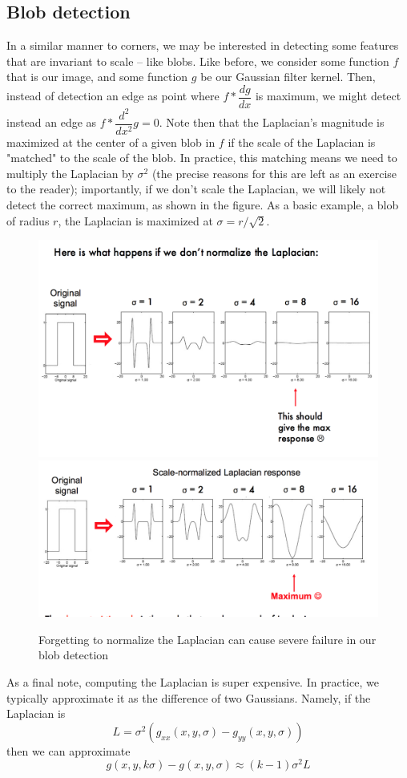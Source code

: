 \documentclass[a4paper, 12pt]{article}
\numberwithin{equation}{section}
\begin{document}
\subsection{Blob detection}
In a similar manner to corners, we may be interested in detecting some features that are invariant to scale -- like blobs. Like before, we consider some function $f$ that is our image, and some function $g$ be our Gaussian filter kernel. Then, instead of detection an edge as point where $f * \dfrac{dg}{dx}$ is maximum, we might detect instead an edge as $f * \dfrac{d^2}{dx^2}g = 0$. Note then that the Laplacian's magnitude is maximized at the center of a given blob in $f$ if the scale of the Laplacian is "matched" to the scale of the blob. In practice, this matching means we need to multiply the Laplacian by $\sigma^2$ (the precise reasons for this are left as an exercise to the reader); importantly, if we don't scale the Laplacian, we will likely not detect the correct maximum, as shown in the figure. As a basic example, a blob of radius $r$, the Laplacian is maximized at $\sigma = r / \sqrt{2}$. 
\begin{figure}
\centering
\includegraphics[scale=0.4]{scale_abnormal}
\includegraphics[scale=0.4]{scale_normal}
\caption{Forgetting to normalize the Laplacian can cause severe failure in our blob detection}
\end{figure}
As a final note, computing the Laplacian is super expensive. In practice, we typically approximate it as the difference of two Gaussians. Namely, if the Laplacian is
$$L = \sigma^2(g_{xx}(x,y,\sigma) - g_{yy}(x,y,\sigma))$$
then we can approximate
$$g(x,y,k\sigma) - g(x,y,\sigma) \approx (k-1)\sigma^2L$$
\end{document}
